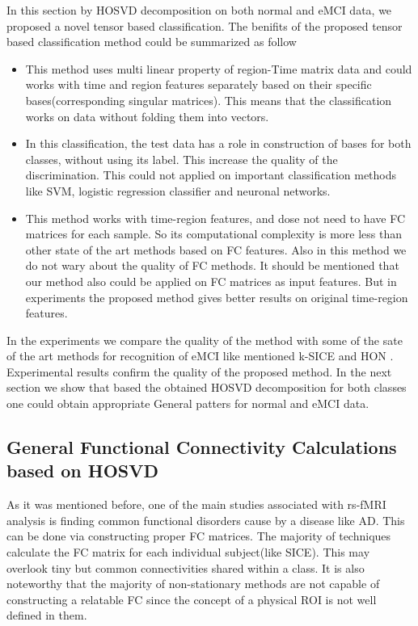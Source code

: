 \documentclass[preprint,12pt]{elsarticle}
\begin{document}
In this section by HOSVD decomposition on both normal and eMCI data, we proposed a novel tensor based classification. The benifits of the proposed tensor based classification method could be summarized as follow
\begin{itemize}
	\item This method  uses multi linear property of region-Time matrix data and  could works with time and region features separately based on their specific bases(corresponding singular matrices). This means that the classification works on data without folding them into vectors.
	\item  In this classification,  the test data has a role in construction of bases for both classes, without using its label. This  increase the quality of the discrimination. This could not applied on important classification methods like SVM, logistic regression classifier and neuronal networks. 
	\item This method works with time-region features, and dose not need to have FC matrices for each sample. So
	its computational complexity is more less than other state of the art methods  based on FC features. Also in this method we do not wary about the quality of FC methods.	
	It should be mentioned that our method also could be applied on FC matrices as input features. But in experiments the proposed method gives better results on original time-region features.  
\end{itemize}
In the experiments we compare the quality of the method with some of the sate of the art methods for recognition of eMCI like mentioned k-SICE and HON .
Experimental results confirm the quality of the proposed method. In the next section we show that based the obtained HOSVD decomposition for both classes one could obtain appropriate General patters for normal and eMCI data.	
\subsection{General Functional Connectivity Calculations based on HOSVD} \label{FC_Construction}


As it was mentioned before, one of the main studies associated with rs-fMRI analysis is finding common functional disorders cause by a disease like AD. This can be done via constructing proper FC matrices. The majority of techniques calculate the FC matrix for each individual subject(like SICE). This may overlook tiny but common connectivities shared within a class. It is also noteworthy that the majority of non-stationary methods are not capable of constructing a relatable FC since the concept of a physical ROI is not well defined in them.    
\end{document}
